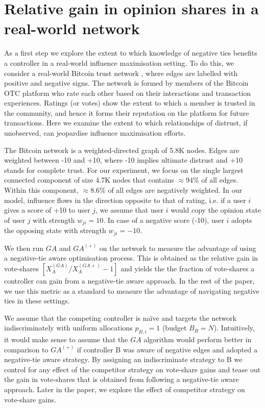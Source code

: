 \section{Relative gain in opinion shares in a real-world network}
\label{bitcoin}
As a first step we explore the extent to which knowledge of negative ties benefits a controller in a real-world influence maximisation setting. To do this, we consider a real-world Bitcoin trust network \cite{kumar2016edge,kumar2018rev2}, where edges are labelled with positive and negative signs. The network is formed by members of the Bitcoin OTC platform who rate each other based on their interactions and transaction experiences. Ratings (or votes) show the extent to which a member is trusted in the community, and hence it forms their reputation on the platform for future transactions. 
Here we examine the extent to which relationships of distrust, if unobserved, can jeopardise influence maximisation efforts.   

The Bitcoin network is a weighted-directed graph of 5.8K nodes. Edges are weighted between -10 and +10, where -10 implies ultimate distrust and +10 stands for complete trust. 
For our experiment, we focus on the single largest connected component of size 4.7K nodes that contains $\approx 94\%$ of all edges. 
Within this component, $\approx 8.6\%$ of all edges are negatively weighted. In our model, influence flows in the direction opposite to that of rating, i.e. if a user $i$ gives a score of +10 to user $j$, we assume that user $i$ would copy the opinion state of user $j$ with strength $w_{ji}=10$. In case of a negative score (-10), user $i$ adopts the opposing state with strength $w_{ji}=-10$. 

We then run $GA$ and $GA^{(+)}$ on the network to measure the advantage of using a negative-tie aware optimisation process. This is obtained as the relative gain in vote-shares $[X_{A}^{(GA)}/X_{A}^{(GA+)} - 1]$ and yields the the fraction of vote-shares a controller can gain from a negative-tie aware approach. In the rest of the paper, we use this metric as a standard to measure the advantage of navigating negative ties in these settings.

 
We assume that the competing controller is naïve and targets the network indiscriminately with uniform allocations $p_{B,i} = 1$ (budget $B_{B} = N$). Intuitively, it would make sense to assume that the $GA$ algorithm would perform better in comparison to $GA^{(+)}$ if controller B was aware of negative edges and adopted a negative-tie aware strategy. By assigning an indiscriminate strategy to B we control for any effect of the competitor strategy on vote-share gains and tease out the gain in vote-shares that is obtained from following a negative-tie aware approach. Later in the paper, we explore the effect of competitor strategy on vote-share gains.

